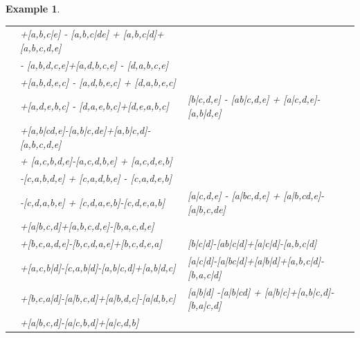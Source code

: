 \documentclass[10pt,a4paper]{amsart}
\numberwithin{equation}{section}
\newtheorem{Example}[Theorem]{Example}
\begin{document}
\begin{Example}
\begin{longtable}{llll}
\begin{aligned}[t]
 &{}+[a,b,c|e] - [a,b,c|de] + [a,b,c|d]+[a,b,c,d,e] \\
 &{}- [a,b,d,c,e]+[a,d,b,c,e] - [d,a,b,c,e]\\
 &{}+[a,b,d,e,c] - [a,d,b,e,c] + [d,a,b,e,c]\\
 &{}+[a,d,e,b,c] - [d,a,e,b,c]+[d,e,a,b,c]
 \end{aligned}$\\
\midrule[0.5pt]
 & & $[a,b|c,d,e]$ &
		 $\!\begin{aligned}[t]
 \partial[a,b|c,d,e] ={}& [b|c,d,e] - [ab|c,d,e] + [a|c,d,e]-[a,b|d,e] \\
 &{}+[a,b|cd,e]-[a,b|c,de]+[a,b|c,d]-[a,b,c,d,e] \\
 &{} + [a,c,b,d,e]-[a,c,d,b,e] + [a,c,d,e,b]\\
 &{}-[c,a,b,d,e] + [c,a,d,b,e] - [c,a,d,e,b]\\
 &{}-[c,d,a,b,e] + [c,d,a,e,b]-[c,d,e,a,b]
 \end{aligned}$\\
\midrule[0.5pt]
 & & $[a|b,c,d,e]$ &
		 $\!\begin{aligned}[t]
 \partial[a|b,c,d,e] ={}& [a|c,d,e] - [a|bc,d,e] + [a|b,cd,e]-[a|b,c,de]\\
 &{}+[a|b,c,d]+[a,b,c,d,e]-[b,a,c,d,e]\\
 &{}+[b,c,a,d,e]-[b,c,d,a,e]+[b,c,d,e,a]
 \end{aligned}$\\
\midrule[0.5pt]
 & & $[a,b|c|d]$ &
		 $\!\begin{aligned}[t]
 \partial[a,b|c|d] ={}& [b|c|d]-[ab|c|d]+[a|c|d]-[a,b,c|d]\\
 &{}+[a,c,b|d]-[c,a,b|d]-[a,b|c,d]+[a,b|d,c]
 \end{aligned}$\\
\midrule[0.5pt]
 & & $[a|b,c|d]$ &
		 $\!\begin{aligned}[t]
 \partial[a|b,c|d] ={}& [a|c|d]-[a|bc|d]+[a|b|d]+[a,b,c|d]-[b,a,c|d]\\
 &{}+[b,c,a|d]-[a|b,c,d]+[a|b,d,c]-[a|d,b,c]
 \end{aligned}$\\
\midrule[0.5pt]
 & & $[a|b|c,d]$ &
		 $\!\begin{aligned}[t]
 \partial[a|b|c,d] ={}& [a|b|d] -[a|b|cd] + [a|b|c]+[a,b|c,d]-[b,a|c,d] \\
 &{}+[a|b,c,d]-[a|c,b,d]+[a|c,d,b]
 \end{aligned}$\\
\midrule[1pt]
 & 2 & $[a,b,c||d]$ &
		 $\!\begin{aligned}[t]

\end{aligned}
\end{longtable}
\end{Example}
\end{document}
